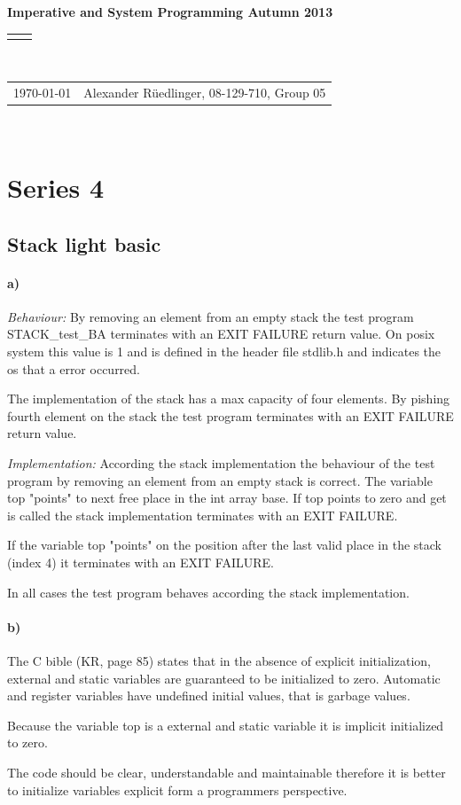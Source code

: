 \documentclass[12pt]{article}
\renewcommand{\title}[1]{\textbf{#1}\\}
\renewcommand{\line}{\begin{tabularx}{\textwidth}{X>{\raggedleft}X}\hline\\\end{tabularx}\\[-0.5cm]}
\newcommand{\leftright}[2]{\begin{tabularx}{\textwidth}{X>{\raggedleft}X}#1%
& #2\\\end{tabularx}\\[-0.5cm]}
\begin{document}
\title{Imperative and System Programming Autumn 2013}
\line
\leftright{\today}{Alexander Rüedlinger, 08-129-710, Group 05} %
\section*{Series 4}
\subsection*{Stack light basic}
\paragraph{a)} 
\emph{Behaviour:}
By removing an element from an empty stack the test program STACK\_test\_BA terminates with an EXIT FAILURE return value. On posix system this value is 1 and is defined in the header file stdlib.h and indicates the os that a error occurred.

The implementation of the stack has a max capacity of four elements. By pishing fourth element on the stack the test program terminates with an EXIT FAILURE return value.

\emph{Implementation:}
According the stack implementation the behaviour of the test program by removing an element from an empty stack is correct. The variable top "points" to next free place in the int array base. If top points to zero and get is called the stack implementation terminates with an EXIT FAILURE.

If the variable top "points" on the position after the last valid place in the stack (index 4) it terminates with an EXIT FAILURE.

In all cases the test program behaves according the stack implementation.

\paragraph{b)}
The C bible (KR, page 85) states that in the absence of explicit initialization, external and static variables are guaranteed to be initialized to zero. Automatic and register variables have undefined initial values, that is garbage values.

Because the variable top is a external and static variable it is implicit initialized to zero.

The code should be clear, understandable and maintainable therefore it is better to initialize variables explicit form a programmers perspective.
\end{document}
